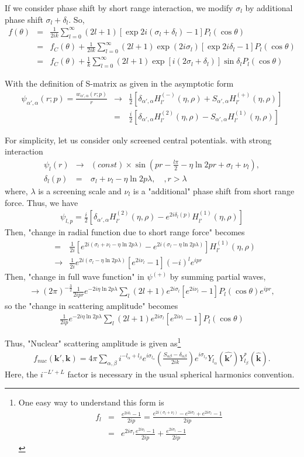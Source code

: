 \documentclass[10pt]{article}
\def\bm{\boldsymbol}
\newcommand{\bea}{\begin{eqnarray}}
\newcommand{\eea}{\end{eqnarray}}
\newcommand{\no}{\nonumber \\}
\def\vk{{\bm k}}
\begin{document}
If we consider phase shift by short range interaction,
we modify $\sigma_l$ by additional phase shift
$\sigma_l+\delta_l$. So,
\bea
f(\theta)&=&\frac{1}{2ik}\sum_{l=0}^\infty (2l+1)
          [\exp 2i(\sigma_l+\delta_l)-1] P_l(\cos\theta)\no
         &=&f_C(\theta)
          +\frac{1}{2ik}\sum_{l=0}^\infty (2l+1)
                    \exp(2i\sigma_l)
                    [\exp 2i\delta_l-1] P_l(\cos\theta)\no
         &=& f_C(\theta)+\frac{1}{k}\sum_{l=0}^\infty (2l+1) \exp[i(2\sigma_l+\delta_l)]\sin\delta_l P_l(\cos\theta)           
\eea



With the definition of S-matrix as given in the
asymptotic form
\bea
\psi_{\alpha',\alpha}(r;p)=\frac{w_{\alpha',\alpha}(r;p)}{r}
&\to& \frac{1}{2}[\delta_{\alpha',\alpha}H_{l'}^{(-)}(\eta,\rho)
           +S_{\alpha',\alpha} H_{l'}^{(+)}(\eta,\rho)]\no
&=&\frac{i}{2}[\delta_{\alpha',\alpha}H_{l'}^{(2)}(\eta,\rho)
           -S_{\alpha',\alpha} H_{l'}^{(1)}(\eta,\rho)]
\eea

For simplicity, let us consider only screened central potentials.
with strong interaction
\bea
\psi_{l}(r)&\to& (const)\times\sin(pr-\frac{l\pi}{2}-\eta\ln 2 p r
                            +\sigma_l+\nu_l),\no
 \delta_l(p)&=&\sigma_l+\nu_l-\eta\ln 2 p \lambda,\quad, r>\lambda
\eea
where, $\lambda$ is a screening scale 
and $\nu_l$ is a "additional"
phase shift from short range force.
Thus, we have
\bea
\psi_{l,p}=\frac{i}{2}[\delta_{\alpha',\alpha}H_{l'}^{(2)}(\eta,\rho)
           -e^{2i\delta_l(p)} H_{l'}^{(1)}(\eta,\rho)]
\eea
Then, "change in radial function due to short range force"
becomes
\bea
&=&\frac{1}{2i}[e^{2i(\sigma_l+\nu_l-\eta \ln 2p\lambda)}
             -e^{2i(\sigma_l-\eta \ln 2p\lambda)}]H_{l'}^{(1)}(\eta,\rho)
             \no
&\to&\frac{1}{2i}e^{2i(\sigma_l-\eta\ln 2p\lambda)}
     [e^{2i\nu_l}-1](-i)^l e^{ipr}                
\eea
Then, "change in full wave function" in $\psi^{(+)}$
by summing partial waves,
\bea
\to (2\pi)^{-\frac{3}{2}}\frac{1}{2ipr}e^{-2i\eta\ln 2p\lambda}
    \sum_l(2l+1)e^{2i\sigma_l}[e^{2i\nu_l}-1]P_l(\cos\theta) e^{ipr},   
\eea
so the "change in scattering amplitude" becomes
\bea
\frac{1}{2ip}e^{-2i\eta\ln 2p\lambda}\sum_{l}(2l+1)e^{2i\sigma_l}
   [e^{2i\nu_l}-1]P_l(\cos\theta)
\eea

Thus, "Nuclear" scattering amplitude is given as\footnote{
One easy way to understand this form is 
\bea
f_l&=&\frac{e^{2i\delta_l}-1}{2ip}
 =\frac{e^{2i(\sigma_l+\nu_l)}-e^{2i\sigma_l}+e^{2i\sigma_l}-1}{2ip}
 \no
 &=&e^{2i\sigma_l}\frac{e^{2i\nu_l}-1}{2ip}
  +\frac{e^{2i\sigma_l}-1}{2ip}
\eea
}
\bea
\boxed{ 
f_{nuc}(\vk',\vk)=4\pi\sum_{\alpha,\beta} i^{-l_\alpha+l_\beta}
       e^{i\sigma_{l_\alpha}}\left(\frac{S_{\alpha\beta}-\delta_{\alpha\beta}}{2ik}\right) e^{i\sigma_{l_\beta}}  
       Y_{l_\alpha}(\hat{\vk'}) Y_{l_\beta}^*(\hat{\vk}). 
 }      
\eea
Here, the $i^{-L'+L}$ factor is necessary
in the usual spherical harmonics convention.
\end{document}
